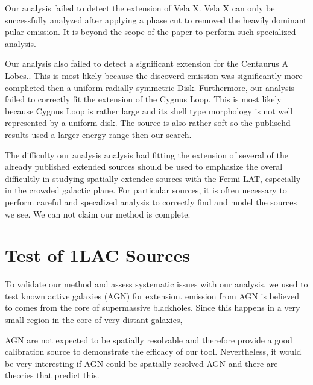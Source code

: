 \documentclass[12pt,preprint]{aastex}
\newcommand{\gev}{\text{GeV}\xspace}
\newcommand{\pointlike}{\text{\em pointlike}\xspace}
\begin{document}
Our analysis failed to detect the extension of Vela X. Vela X can only be
successfully analyzed after applying a phase cut to removed the heavily
dominant pular emission. It is beyond the scope of the paper to perform
such specialized analysis.

Our analysis also failed to detect a significant extension for the
Centaurus A Lobes.\cite{CenA paper}. This is most likely because the
discoverd emission was significantly more complicted then a uniform
radially symmetric Disk.  Furthermore, our analysis failed to correctly
fit the extension of the Cygnus Loop\cite{Cygnus Loop Paper}.  This is
most likely because Cygnus Loop is rather large and its shell type
morphology is not well represented by a uniform disk. The source is
also rather soft so the publisehd results used a larger energy range
then our search.

The difficulty our analysis analysis had fitting the extension of several
of the already published extended sources should be used to emphasize the
overal difficultly in studying spatially extendee sources with the Fermi
LAT, especially in the crowded galactic plane. For particular sources,
it is often necessary to perform careful and specalized analysis to
correctly find and model the sources we see. We can not claim our method
is complete.

\section{Test of 1LAC Sources}

To validate our method and assess systematic issues with our
analysis, we used \pointlike to test known active galaxies (AGN) for extension.
\gev emission from AGN is believed to comes from the
core of supermassive blackholes. Since this happens in a very small region
in the core of very distant galaxies,

AGN are not expected to be spatially resolvable and therefore
provide a good calibration source to demonstrate the efficacy of our
tool. Nevertheless, it would be very interesting if AGN could be
spatially resolved AGN and there are theories that predict
this\cite{pair_halo_paper}.
\end{document}
